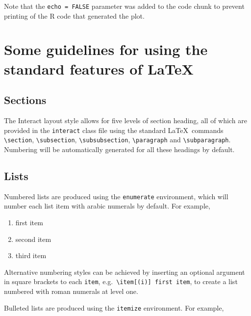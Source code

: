 \documentclass[]{interact}
\theoremstyle{plain}%
\theoremstyle{definition}
\theoremstyle{remark}
\providecommand{\tightlist}{%
  \setlength{\itemsep}{0pt}\setlength{\parskip}{0pt}}
\def\tightlist{}
\begin{document}
Note that the \texttt{echo\ =\ FALSE} parameter was added to the code
chunk to prevent printing of the R code that generated the plot.

\hypertarget{some-guidelines-for-using-the-standard-features-of}{%
\section{\texorpdfstring{Some guidelines for using the standard features
of
\LaTeX}{Some guidelines for using the standard features of }}\label{some-guidelines-for-using-the-standard-features-of}}

\hypertarget{sections}{%
\subsection{Sections}\label{sections}}

The \textsf{Interact} layout style allows for five levels of section
heading, all of which are provided in the \texttt{interact} class file
using the standard \LaTeX~commands \texttt{\textbackslash{}section},
\texttt{\textbackslash{}subsection},
\texttt{\textbackslash{}subsubsection},
\texttt{\textbackslash{}paragraph} and
\texttt{\textbackslash{}subparagraph}. Numbering will be automatically
generated for all these headings by default.

\hypertarget{lists}{%
\subsection{Lists}\label{lists}}

Numbered lists are produced using the \texttt{enumerate} environment,
which will number each list item with arabic numerals by default. For
example,

\begin{enumerate}
\def\labelenumi{\arabic{enumi}.}
\tightlist
\item
  first item
\item
  second item
\item
  third item
\end{enumerate}

Alternative numbering styles can be achieved by inserting an optional
argument in square brackets to each \texttt{item},
e.g.~\texttt{\textbackslash{}item{[}(i){]}\ first\ item}, to create a
list numbered with roman numerals at level one.

Bulleted lists are produced using the \texttt{itemize} environment. For
example,
\end{document}
